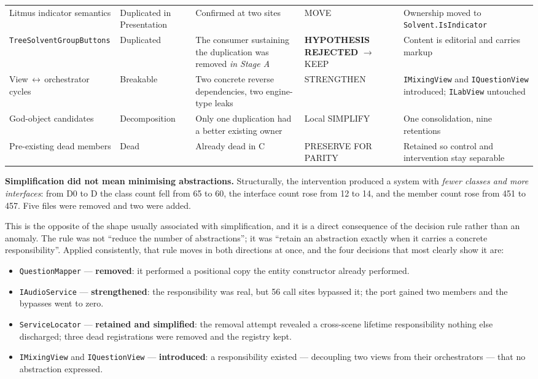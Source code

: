 \documentclass{sbc2019}%
\begin{document}
\begin{table}[!tp]
\begin{tabular}{p{}p{}p{}p{}p{}}
\addlinespace
Litmus indicator semantics & Duplicated in Presentation & Confirmed at two sites & MOVE & Ownership moved to \texttt{Solvent.\allowbreak{}IsIndicator} \\
\addlinespace
\texttt{TreeSolvent\allowbreak{}GroupButtons} & Duplicated & The consumer sustaining the duplication was removed \emph{in Stage A} & \textbf{HYPOTHESIS REJECTED} $\rightarrow$ KEEP & Content is editorial and carries markup \\
\addlinespace
View\,$\leftrightarrow$\,orchestrator cycles & Breakable & Two concrete reverse dependencies, two engine-type leaks & STRENGTHEN & \texttt{IMixingView} and \texttt{IQuestionView} introduced; \texttt{ILabView} untouched \\
\addlinespace
God-object candidates & Decomposition & Only one duplication had a better existing owner & Local SIMPLIFY & One consolidation, nine retentions \\
\addlinespace
Pre-existing dead members & Dead & Already dead in C & PRESERVE FOR PARITY & Retained so control and intervention stay separable \\
\bottomrule
\end{tabular}
\end{table}

\medskip\noindent\textbf{Simplification did not mean minimising abstractions.}
Structurally, the intervention produced a system with \emph{fewer classes and
more interfaces}: from D0 to D the class count fell from 65 to 60, the interface
count rose from 12 to 14, and the member count rose from 451 to 457. Five files
were removed and two were added.

This is the opposite of the shape usually associated with simplification, and it
is a direct consequence of the decision rule rather than an anomaly. The rule was
not ``reduce the number of abstractions''; it was ``retain an abstraction exactly
when it carries a concrete responsibility''. Applied consistently, that rule
moves in both directions at once, and the four decisions that most clearly show
it are:

\begin{itemize}\itemsep2pt
\item \texttt{QuestionMapper} --- \textbf{removed}: it performed a positional
copy the entity constructor already performed.
\item \texttt{IAudioService} --- \textbf{strengthened}: the responsibility was
real, but 56 call sites bypassed it; the port gained two members and the bypasses
went to zero.
\item \texttt{ServiceLocator} --- \textbf{retained and simplified}: the removal
attempt revealed a cross-scene lifetime responsibility nothing else discharged;
three dead registrations were removed and the registry kept.
\item \texttt{IMixingView} and \texttt{IQuestionView} --- \textbf{introduced}:
a responsibility existed --- decoupling two views from their orchestrators --- that
no abstraction expressed.
\end{itemize}
\end{document}
